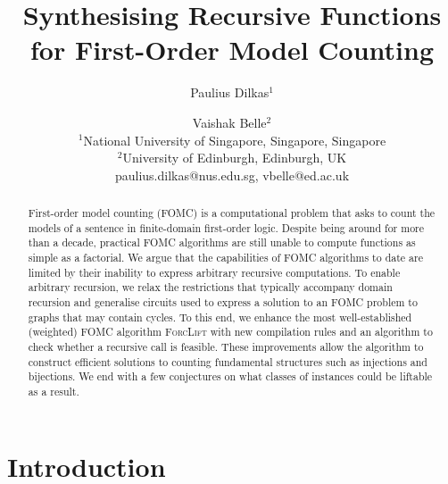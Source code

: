 \documentclass{article}
\title{Synthesising Recursive Functions for First-Order Model Counting}
\author{%
Paulius Dilkas$^1$\and
Vaishak Belle$^2$\\
\affiliations
$^1$National University of Singapore, Singapore, Singapore\\
$^2$University of Edinburgh, Edinburgh, UK\\
\emails
paulius.dilkas@nus.edu.sg,
vbelle@ed.ac.uk
}
\theoremstyle{definition}
\begin{document}
\maketitle

\begin{abstract}
  First-order model counting (FOMC) is a computational problem that asks to
  count the models of a sentence in finite-domain first-order logic. Despite
  being around for more than a decade, practical FOMC algorithms are still
  unable to compute functions as simple as a factorial. We argue that the
  capabilities of FOMC algorithms to date are limited by their inability to
  express arbitrary recursive computations. To enable arbitrary recursion, we
  relax the restrictions that typically accompany domain recursion and
  generalise circuits used to express a solution to an FOMC problem to graphs
  that may contain cycles. To this end, we enhance the most well-established
  (weighted) FOMC algorithm \textsc{ForcLift} with new compilation rules and an
  algorithm to check whether a recursive call is feasible. These improvements
  allow the algorithm to construct efficient solutions to counting fundamental
  structures such as injections and bijections. We end with a few conjectures on
  what classes of instances could be liftable as a result.
\end{abstract}

\section{Introduction}\label{sec:introduction}




\end{document}
